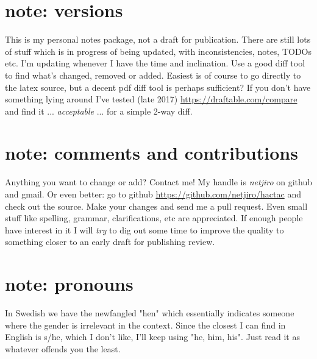 \documentclass[11pt, twoside, titlepage, a4paper]{report}
\begin{document}
\newpage
\section*{note: versions}
This is my personal notes package, not a draft for publication. There are still lots of stuff which is in progress of being updated, with inconsistencies, notes, TODOs etc.
I'm updating whenever I have the time and inclination. Use a good diff tool to find what's changed, removed or added. Easiest is of course to go directly to the latex source, but a decent pdf diff tool is perhaps sufficient? If you don't have something lying around I've tested (late 2017) \url{https://draftable.com/compare} and find it ... \emph{acceptable} ... for a simple 2-way diff. %


\section*{note: comments and contributions}
Anything you want to change or add? Contact me! My handle is \emph{netjiro} on github and gmail. Or even better: go to github \url{https://github.com/netjiro/hactac} and check out the source. Make your changes and send me a pull request. Even small stuff like spelling, grammar, clarifications, etc are appreciated. If enough people have interest in it I will \emph{try} to dig out some time to improve the quality to something closer to an early draft for publishing review.


\section*{note: pronouns}
In Swedish we have the newfangled "hen" which essentially indicates someone where the gender is irrelevant in the context. Since the closest I can find in English is s/he, which I don't like, I'll keep using "he, him, his". Just read it as whatever offends you the least.







\end{document}
